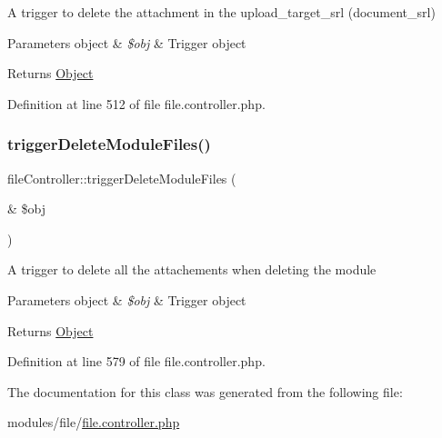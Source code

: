 A trigger to delete the attachment in the upload\+\_\+target\+\_\+srl (document\+\_\+srl)


\begin{DoxyParams}[1]{Parameters}
object & {\em \$obj} & Trigger object \\
\hline
\end{DoxyParams}
\begin{DoxyReturn}{Returns}
\hyperlink{classObject}{Object} 
\end{DoxyReturn}


Definition at line 512 of file file.\+controller.\+php.

\mbox{\label{classfileController_a68fbf2cdcb182912d4138f269904a1ba}} 
\subsubsection{\texorpdfstring{trigger\+Delete\+Module\+Files()}{triggerDeleteModuleFiles()}}
{\footnotesize\ttfamily file\+Controller\+::trigger\+Delete\+Module\+Files (\begin{DoxyParamCaption}\item[{\&}]{\$obj }\end{DoxyParamCaption})}

A trigger to delete all the attachements when deleting the module


\begin{DoxyParams}[1]{Parameters}
object & {\em \$obj} & Trigger object \\
\hline
\end{DoxyParams}
\begin{DoxyReturn}{Returns}
\hyperlink{classObject}{Object} 
\end{DoxyReturn}


Definition at line 579 of file file.\+controller.\+php.



The documentation for this class was generated from the following file\+:\begin{DoxyCompactItemize}
\item 
modules/file/\hyperlink{file_8controller_8php}{file.\+controller.\+php}\end{DoxyCompactItemize}
